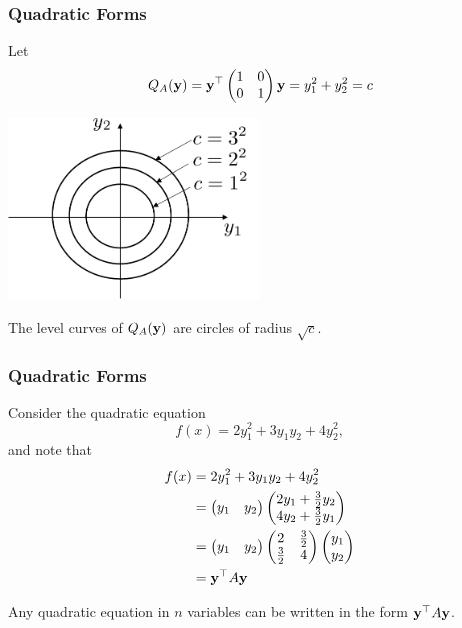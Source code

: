 \documentclass{beamer}
\begin{document}
\begin{frame}\frametitle{Quadratic Forms}
	\begin{example}
		Let 
		\[
			Q_A(\mathbf{y}) = \mathbf{y}^\top \begin{pmatrix} 1 & 0 \\ 0 & 1 \end{pmatrix} \mathbf{y} = y_1^2 + y_2^2 = c
		\]
		\begin{center}
			\includegraphics[width=0.5\textwidth]
				{figures/chap6_level_curve_circle}	
		\end{center}
		The level curves of $Q_A(\mathbf{y})$ are circles of radius $\sqrt{c}$.
	\end{example}
\end{frame}


\begin{frame}\frametitle{Quadratic Forms}
	\begin{example}
	Consider the quadratic equation
	\[
		f(x) = 2y_1^2 + 3 y_1 y_2 + 4 y_2^2,
	\]	
	and note that
	\begin{align*}
		f(x) 
			&= 2y_1^2 + 3 y_1 y_2 + 4 y_2^2 \\
		 	&= 	\begin{pmatrix}
 					y_1 & y_2 
 				\end{pmatrix}
 				\begin{pmatrix}
 					2y_1 + \frac{3}{2} y_2 \\
 					4y_2 + \frac{3}{2} y_1
 				\end{pmatrix} \\
 		 	&= 	\begin{pmatrix}
 					y_1 & y_2 
 				\end{pmatrix}
 				\begin{pmatrix}
 					2 & \frac{3}{2} \\
 					\frac{3}{2} & 4 
 				\end{pmatrix} 
 				\begin{pmatrix}
 					y_1 \\ y_2	
 				\end{pmatrix} \\
 			&= \mathbf{y}^\top A \mathbf{y}
	\end{align*}
	\end{example}
	
	Any quadratic equation in $n$ variables can be written in the form $\mathbf{y}^\top A \mathbf{y}$.
	
\end{frame}
\end{document}
